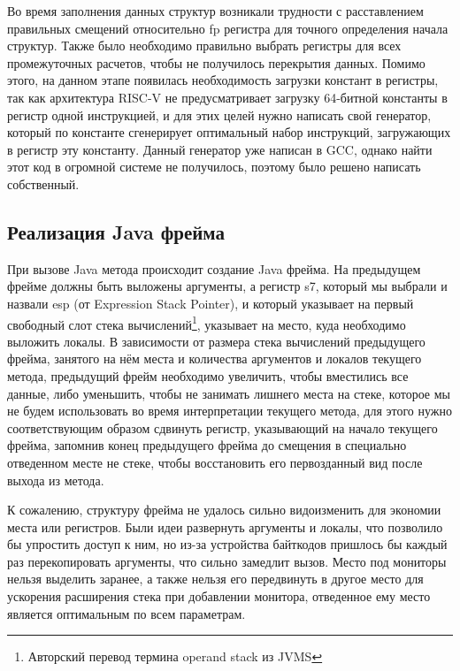  
Во время заполнения данных структур возникали трудности с расставлением правильных смещений относительно fp регистра для точного определения начала структур. Также было необходимо правильно выбрать регистры для всех промежуточных расчетов, чтобы не получилось перекрытия данных. Помимо этого, на данном этапе появилась необходимость загрузки констант в регистры, так как архитектура RISC-V не предусматривает загрузку 64-битной константы в регистр одной инструкцией, и для этих целей нужно написать свой генератор, который по константе сгенерирует оптимальный набор инструкций, загружающих в регистр эту константу. Данный генератор уже написан в GCC, однако найти этот код в огромной системе не получилось, поэтому было решено написать собственный.





\subsection{Реализация Java фрейма}
При вызове Java метода происходит создание Java фрейма. На предыдущем фрейме должны быть выложены аргументы, а регистр s7, который мы выбрали и назвали esp (от Expression Stack Pointer), и который указывает на первый свободный слот стека вычислений\footnote{Авторский перевод термина operand stack из JVMS}, указывает на место, куда необходимо выложить локалы. В зависимости от размера стека вычислений предыдущего фрейма, занятого на нём места и количества аргументов и локалов текущего метода, предыдущий фрейм необходимо увеличить, чтобы вместились все данные, либо уменьшить, чтобы не занимать лишнего места на стеке, которое мы не будем использовать во время интерпретации текущего метода, для этого нужно соответствующим образом сдвинуть регистр, указывающий на начало текущего фрейма, запомнив конец предыдущего фрейма до смещения в специально отведенном месте не стеке, чтобы восстановить его первозданный вид после выхода из метода.\newline


К сожалению, структуру фрейма не удалось сильно видоизменить для экономии места или регистров. Были идеи развернуть аргументы и локалы, что позволило бы упростить доступ к ним, но из-за устройства байткодов пришлось бы каждый раз перекопировать аргументы, что сильно замедлит вызов. Место под мониторы нельзя выделить заранее, а также нельзя его передвинуть в другое место для ускорения расширения стека при добавлении монитора, отведенное ему место является оптимальным по всем параметрам.




